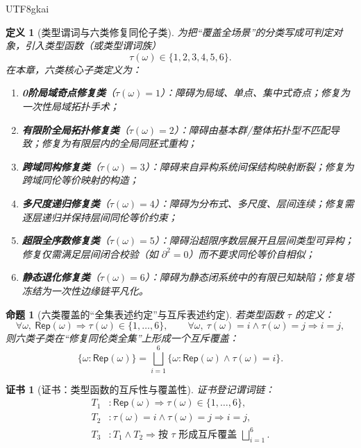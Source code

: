 \documentclass[12pt]{article}
\newtheorem{definition}{定义}[section]
\newtheorem{proposition}{命题}[section]
\newtheorem{Certificate}{证书}[section]
\newcommand{\KouJing}{\texorpdfstring{表述约定}{表述约定}}
\begin{document}
\begin{CJK*}{UTF8}{gkai}
\begin{definition}[类型谓词与六类修复同伦子类]
\label{def:tex29-six-classes}
为把“覆盖全场景”的分类写成可判定对象，引入类型函数（或类型谓词族）
\[
  \tau(\omega)\in\{1,2,3,4,5,6\}.
\]
在本章，六类核心子类定义为：
\begin{enumerate}
  \item \textbf{0阶局域奇点修复类}（$\tau(\omega)=1$）：障碍为局域、单点、集中式奇点；修复为一次性局域拓扑手术；
  \item \textbf{有限阶全局拓扑修复类}（$\tau(\omega)=2$）：障碍由基本群/整体拓扑型不匹配导致；修复为有限层内的全局同胚式重构；
  \item \textbf{跨域同构修复类}（$\tau(\omega)=3$）：障碍来自异构系统间保结构映射断裂；修复为跨域同伦等价映射的构造；
  \item \textbf{多尺度递归修复类}（$\tau(\omega)=4$）：障碍为分布式、多尺度、层间连续；修复需逐层递归并保持层间同伦等价约束；
  \item \textbf{超限全序数修复类}（$\tau(\omega)=5$）：障碍沿超限序数层展开且层间类型可异构；修复仅需满足层间闭合校验（如 $\partial^2=0$）而不要求同伦等价自相似；
  \item \textbf{静态退化修复类}（$\tau(\omega)=6$）：障碍为静态闭系统中的有限已知缺陷；修复塔冻结为一次性边缘链平凡化。
\end{enumerate}
\end{definition}

\begin{proposition}[六类覆盖的“全集\KouJing”与互斥\KouJing]
\label{prop:tex29-six-classes-cover}
若类型函数 $\tau$ 的定义：
\[
  \forall \omega,\ \mathsf{Rep}(\omega)\Rightarrow \tau(\omega)\in\{1,\dots,6\},
  \qquad
  \forall \omega,\ \tau(\omega)=i\wedge\tau(\omega)=j\Rightarrow i=j,
\]
则六类子类在“修复同伦类全集”上形成一个互斥覆盖：
\[
  \{\omega:\mathsf{Rep}(\omega)\}=\bigsqcup_{i=1}^{6}\{\omega:\mathsf{Rep}(\omega)\wedge \tau(\omega)=i\}.
\]
\end{proposition}

\begin{Certificate}[证书：类型函数的互斥性与覆盖性]
\label{cert:tex29-six-classes-cover}
证书登记谓词链：
\[
\begin{aligned}
  T_1 &: \mathsf{Rep}(\omega)\Rightarrow \tau(\omega)\in\{1,\dots,6\},\\
  T_2 &: \tau(\omega)=i\wedge\tau(\omega)=j\Rightarrow i=j,\\
  T_3 &: T_1\wedge T_2\Rightarrow \text{按 }\tau\text{ 形成互斥覆盖 } \bigsqcup_{i=1}^{6}.
\end{aligned}
\]
\end{Certificate}


\end{CJK*}
\end{document}

